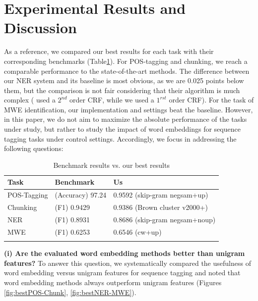 \section{Experimental Results and Discussion}

As a reference, we compared our best results for each task with their corresponding benchmarks (Table\ref{benchmark}). 
For POS-tagging and chunking, we reach a comparable performance to the state-of-the-art methods.
The difference between our NER system and its baseline is most obvious, as we are 0.025 points below them, but the comparison is not fair considering that their algorithm is much complex
( used a $2^{nd}$ order CRF, while we used a $1^{rst}$ order CRF).
For the task of MWE identification, our implementation and settings beat the baseline. 
However, in this paper, we do not aim to maximize the absolute performance of the tasks under 
study, but rather to study the impact of word embeddings for sequence tagging tasks under control settings. 
Accordingly, we focus in addressing the following questions:

\begin{table}
\caption{Benchmark results vs. our best results}
\begin{center}
\begin{small}
\begin{tabular}{lll}
\hline
\textbf{Task} & \textbf{Benchmark} & \textbf{Us} \\ \hline
POS-Tagging & (Accuracy) 97.24 \cite{Toutanova:2003} & 0.9592 (skip-gram negsam+up) \\ 
Chunking & (F1) 0.9429 \cite{Sha:2003} & 0.9386 (Brown cluster v2000+)\\  
NER & (F1) 0.8931 \cite{Ando:2005} & 0.8686 (skip-gram negsam+noup)\\  
MWE & (F1) 0.6253 \cite{Schneider+:2014} & 0.6546 (cw+up)\\ 
\hline
\label{benchmark}
\end{tabular}
\end{small}
\end{center}
\end{table}


\textbf{(i) Are the evaluated word embedding methods better than unigram features?}
To answer this question, we systematically compared the usefulness of word embedding versus
unigram features for sequence tagging and noted that word embedding methods always outperform 
unigram features (Figures \ref{fig:bestPOS-Chunk}, \ref{fig:bestNER-MWE}). 

